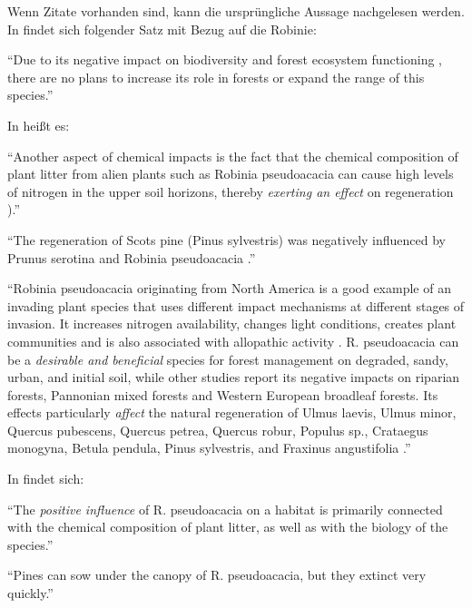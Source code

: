 \documentclass[twocolumn]{scrartcl}
\begin{document}
Wenn Zitate vorhanden sind, kann die ursprüngliche Aussage nachgelesen
werden. In \citet{szyp2023robinieGenetik} findet sich folgender Satz
mit Bezug auf die Robinie:

\enquote{Due to its negative impact on biodiversity and forest
  ecosystem functioning \citep{langmaier2020alienPlants}, there are no
  plans to increase its role in forests or expand the range of this
  species.}

In \citep{langmaier2020alienPlants} heißt es:

\enquote{Another aspect of chemical impacts is the fact that the
  chemical composition of plant litter from alien plants such as
  Robinia pseudoacacia can cause high levels of nitrogen in the upper
  soil horizons, thereby \emph{exerting an effect} on regeneration
  \citep{rahmonov2009robinieLitter}).}

\enquote{The regeneration of Scots pine (Pinus sylvestris) was
  negatively influenced by Prunus serotina and Robinia pseudoacacia
  \citep{sebert2007invasive,rahmonov2009robinieLitter}.}

\enquote{Robinia pseudoacacia originating from North America is a good
  example of an invading plant species that uses different impact
  mechanisms at different stages of invasion. It increases nitrogen
  availability, changes light conditions, creates plant communities
  and is also associated with allopathic activity
  \citep{rahmonov2009robinieLitter,campagnaro2018alien}.
  R. pseudoacacia can be a \emph{desirable and beneficial} species for forest
  management on degraded, sandy, urban, and initial soil, while other
  studies report its negative impacts on riparian forests, Pannonian
  mixed forests and Western European broadleaf forests. Its effects
  particularly \emph{affect} the natural regeneration of Ulmus laevis,
  Ulmus minor, Quercus pubescens, Quercus petrea, Quercus robur,
  Populus sp., Crataegus monogyna, Betula pendula, Pinus sylvestris,
  and Fraxinus angustifolia
  \citep{rahmonov2009robinieLitter,maringer2012robinePostFire,petrasova2013neophyten,radtke2013robinieNiederwald,terwei2013nonNative}.}

In \citet{rahmonov2009robinieLitter} findet sich:

\enquote{The \emph{positive influence} of R. pseudoacacia on a habitat
  is primarily connected with the chemical composition of plant
  litter, as well as with the biology of the species.}

\enquote{Pines can sow under the canopy of R. pseudoacacia, but they
  extinct very quickly.}
\end{document}
